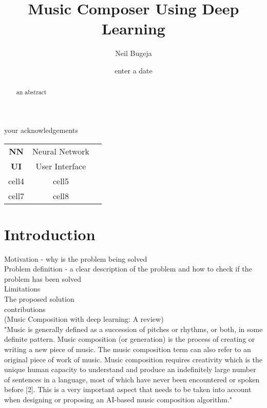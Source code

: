 \documentclass[12pt, a4paper]{report}
\theoremstyle{definition}
\theoremstyle{definition}%
\theoremstyle{definition}%
\theoremstyle{definition}%
\theoremstyle{definition}%
\theoremstyle{definition}%
\begin{document}
\title{Music Composer Using Deep Learning}
\author{Neil Bugeja}
\date{enter a date}

\frontmatter


\begin{acknowledgements}
your acknowledgements
\end{acknowledgements}
       
\begin{abstract}
an abstract
\end{abstract}

\tableofcontents

\listoffigures

\listoftables

\listofabbreviations

\begin{center}
\begin{tabular}{ c c c }
 \textbf{NN}  & Neural Network\\ 
 \textbf{UI}  & User Interface\\ 
 cell4 & cell5 \\  
 cell7 & cell8    
\end{tabular}
\end{center}



\mainmatter

\chapter{Introduction}

Motivation - why is the problem being solved\\
Problem definition - a clear description of the problem and how to check if the problem has been solved \\
Limitations\\
The proposed solution\\
contributions\\

(Music Composition with deep learning: A review)\\
"Music is generally defined as a succession of pitches or rhythms, or both, in some definite pattern. Music composition (or generation) is the process of creating or writing a new piece of music. The music composition term can also refer to an original piece of work of music. Music composition requires creativity which is the unique human capacity to understand and produce an indefinitely large number of sentences in a language, most of which have
never been encountered or spoken before [2]. This is a very important aspect that needs to be taken into account when
designing or proposing an AI-based music composition algorithm."\\
\end{document}
